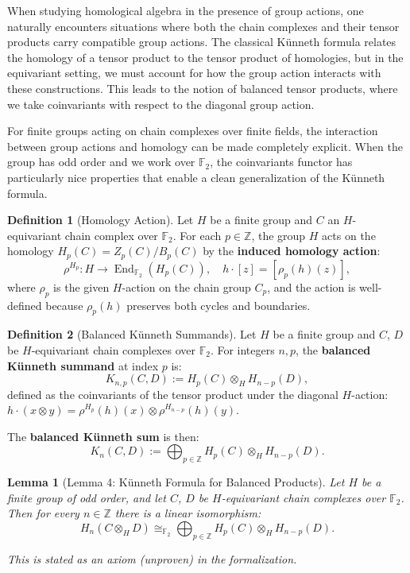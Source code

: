 \documentclass[11pt]{article}
\theoremstyle{plain}
\newtheorem*{lemma}{Lemma}
\theoremstyle{definition}
\newtheorem*{definition}{Definition}
\theoremstyle{remark}
\begin{document}
When studying homological algebra in the presence of group actions, one naturally encounters situations where both the chain complexes and their tensor products carry compatible group actions. The classical Künneth formula relates the homology of a tensor product to the tensor product of homologies, but in the equivariant setting, we must account for how the group action interacts with these constructions. This leads to the notion of balanced tensor products, where we take coinvariants with respect to the diagonal group action.

For finite groups acting on chain complexes over finite fields, the interaction between group actions and homology can be made completely explicit. When the group has odd order and we work over $\mathbb{F}_2$, the coinvariants functor has particularly nice properties that enable a clean generalization of the Künneth formula.

\begin{definition}[Homology Action]
Let $H$ be a finite group and $C$ an $H$-equivariant chain complex over $\mathbb{F}_2$. For each $p \in \mathbb{Z}$, the group $H$ acts on the homology $H_p(C) = Z_p(C)/B_p(C)$ by the \textbf{induced homology action}:
\[\rho^{H_p} : H \to \operatorname{End}_{\mathbb{F}_2}(H_p(C)), \quad h \cdot [z] = [\rho_p(h)(z)],\]
where $\rho_p$ is the given $H$-action on the chain group $C_p$, and the action is well-defined because $\rho_p(h)$ preserves both cycles and boundaries.
\end{definition}

\begin{definition}[Balanced Künneth Summands]
Let $H$ be a finite group and $C$, $D$ be $H$-equivariant chain complexes over $\mathbb{F}_2$. For integers $n, p$, the \textbf{balanced Künneth summand} at index $p$ is:
\[K_{n,p}(C,D) := H_p(C) \otimes_H H_{n-p}(D),\]
defined as the coinvariants of the tensor product under the diagonal $H$-action: $h \cdot (x \otimes y) = \rho^{H_p}(h)(x) \otimes \rho^{H_{n-p}}(h)(y)$.

The \textbf{balanced Künneth sum} is then:
\[K_n(C,D) := \bigoplus_{p \in \mathbb{Z}} H_p(C) \otimes_H H_{n-p}(D).\]
\end{definition}

\begin{lemma}[Lemma 4: Künneth Formula for Balanced Products]
Let $H$ be a finite group of odd order, and let $C$, $D$ be $H$-equivariant chain complexes over $\mathbb{F}_2$. Then for every $n \in \mathbb{Z}$ there is a linear isomorphism:
\[H_n(C \otimes_H D) \cong_{\mathbb{F}_2} \bigoplus_{p \in \mathbb{Z}} H_p(C) \otimes_H H_{n-p}(D).\]

\textit{This is stated as an axiom (unproven) in the formalization.}
\end{lemma}
\end{document}
